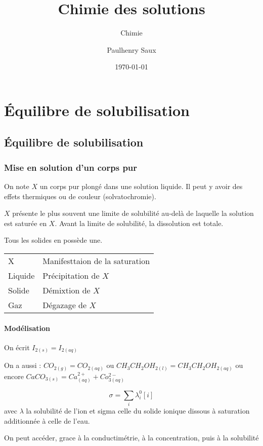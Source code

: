 \documentclass[french]{yLectureNote}
\title{Chimie des solutions}
\subtitle{Chimie}
\author{Paulhenry Saux}
\date{\today}
\begin{document}
\setcounter{chapter}{2}
	\chapter{Équilibre de solubilisation}
	\section{Équilibre de solubilisation}
	\subsection{Mise en solution d'un corps pur}
	On note $X$ un corps pur plongé dans une solution liquide. Il peut y avoir des effets thermiques ou de couleur (solvatochromie).
	\begin{definition}
	\(X\) présente le plus souvent une limite de solubilité au-delà de laquelle la solution est saturée en \(X\). Avant la limite de solubilité, la dissolution est totale.
	\end{definition}
	Tous les solides en possède une.
	\begin{center}
\begin{tabular}{ll}
X & Manifesttaion de la saturation\\
Liquide & Précipitation de \(X\)\\
Solide & Démixtion de \(X\)\\
Gaz & Dégazage de \(X\)
	\end{tabular}
	\end{center}
	\subsubsection{Modélisation}
	On écrit \(I_{2(s)} = I_{2(aq)}\)

	On a aussi : \(CO_{2(g)} = CO_{2(aq)}\) ou \(CH_3CH_2OH_{2(l)} = CH_3CH_2OH_{2(aq)}\) ou encore \(CaCO_{3(s)} = Ca^{2+}_{(aq)}+Co^{2-}_{3(aq)}\)

	\begin{theorem}
	 \[\sigma = \sum_i \lambda^0_i [i]\] avec \(\lambda\) la solubilité de l'ion et sigma celle du solide ionique dissous à saturation additionnée à celle de l'eau.
	\end{theorem}
	On peut accéder, grace à la conductimétrie, à la concentration, puis à la solubilité
\end{document}
